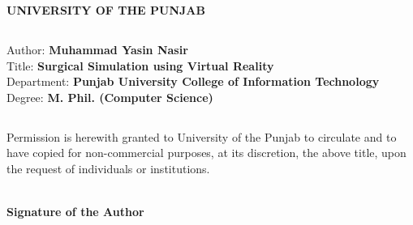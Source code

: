 



%

\begin{center}
\textbf{ UNIVERSITY OF THE PUNJAB } %
\end{center}


\subsection*{} 
\vspace{7mm}
Author: \hspace{10mm} %
\textbf{Muhammad Yasin Nasir}  \\
Title: \hspace{13mm}
\textbf{ Surgical Simulation using Virtual Reality} \\ 
Department: \quad
\textbf{Punjab University College of Information Technology}\\ 
Degree: \hspace{7mm}
\textbf{\quad M. Phil. (Computer Science)}\\ 


\subsection*{}
Permission is herewith granted to University of the Punjab to circulate and to have copied for non-commercial purposes, at its discretion, the above title, upon the request of individuals or institutions. 
\\ \\ 
\begin{flushright}
\textbf{Signature of the Author}
\end{flushright}
 
